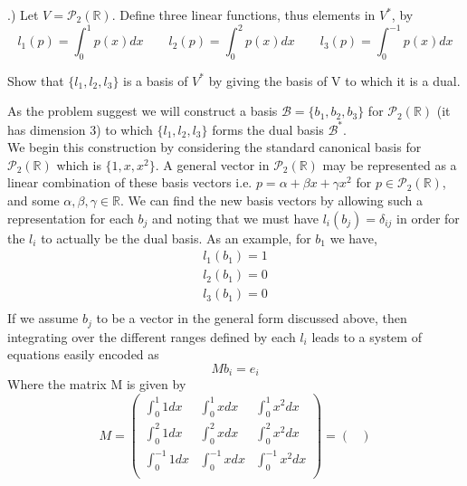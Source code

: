 \documentclass[a4paper, 11pt]{article}
\newcommand{\R}{\mathbb{R}}
\newenvironment{solution}{%
	\begin{list}{}{%
			\setlength{\topsep}{0pt}%
			\setlength{\leftmargin}{1.5cm}%
			\setlength{\rightmargin}{1.5cm}%
			\setlength{\listparindent}{\parindent}%
			\setlength{\itemindent}{\parindent}%
			\setlength{\parsep}{\parskip}%
		}%
		\item[]}{\end{list}}
\begin{document}
.) Let $V=\mathcal{P}_2(\R)$. Define three linear functions, thus elements in $V^*$, by 
	\begin{equation*}
		l_1(p)=\int_0^1 p(x)dx \qquad l_2(p)=\int_0^2 p(x)dx \qquad l_3(p)=\int_0^{-1}p(x)dx
	\end{equation*}
	
\noindent Show that $\{l_1, l_2, l_3\}$ is a basis of $V^*$ by giving the basis of V to which it is a dual. \\
	\begin{solution}
		\noindent As the problem suggest we will construct a basis $\mathcal{B}=\{b_1, b_2, b_3\}$ for $\mathcal{P}_2(\R)$  (it has dimension 3) to which $\{l_1, l_2, l_3\}$ forms the dual basis $\mathcal{B}^*$. \\
		
		\noindent We begin this construction by considering the standard canonical basis for $\mathcal{P}_2(\R)$ which is $\{1, x, x^2\}$. A general vector in $\mathcal{P}_2(\R)$ may be represented as a linear combination of these basis vectors i.e. $p = \alpha + \beta x + \gamma x^2$ for $p\in \mathcal{P}_2(\R)$, and some $\alpha,\beta,\gamma\in\R$.  We can find the new basis vectors by allowing such a representation for each $b_j$ and noting that we must have $l_i(b_j) = \delta_{ij}$ in order for the $l_i$ to actually be the dual basis. As an example, for $b_1$ we have, 
			\begin{align*}
				l_1(b_1) = 1\\
				l_2(b_1) = 0\\
				l_3(b_1) = 0 \\ 
			\end{align*}
		If we assume $b_j$ to be a vector in the general form discussed above, then integrating over the different ranges defined by each $l_i$ leads to a system of equations easily encoded as 
			\begin{equation*}
				M b_i = e_i 
			\end{equation*}
		Where the matrix M is given by 
			\begin{equation*}
				M = \begin{pmatrix}
				\int_0^1 1dx & \int_0^1 xdx & \int_0^1 x^2dx \\ 
				\int_0^2 1dx & \int_0^2 xdx & \int_0^2 x^2dx \\ 
				\int_0^{-1} 1dx & \int_0^{-1} xdx & \int_0^{-1} x^2dx \\ 		
				\end{pmatrix} = \begin{pmatrix}

\end{pmatrix}
\end{equation*}
\end{solution}
\end{document}
